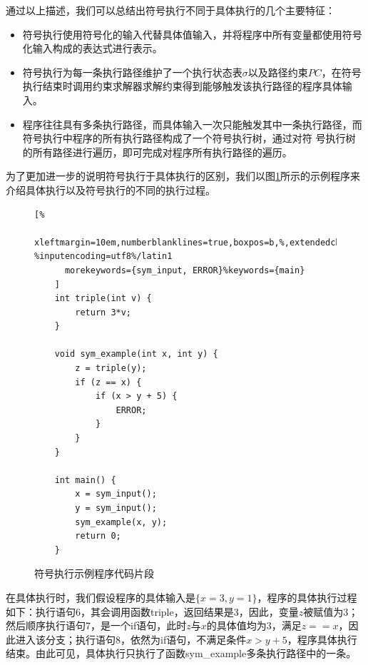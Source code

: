 通过以上描述，我们可以总结出符号执行不同于具体执行的几个主要特征：
\begin{itemize}
    \item 符号执行使用符号化的输入代替具体值输入，并将程序中所有变量都使用符号化输入构成的表达式进行表示。
    \item 符号执行为每一条执行路径维护了一个执行状态表$\sigma$以及路径约束$PC$，在符号执行结束时调用约束求解器求解约束得到能够触发该执行路径的程序具体输入。
    \item 程序往往具有多条执行路径，而具体输入一次只能触发其中一条执行路径，而符号执行中程序的所有执行路径构成了一个符号执行树，通过对符 号执行树的所有路径进行遍历，即可完成对程序所有执行路径的遍历。
\end{itemize}

为了更加进一步的说明符号执行于具体执行的区别，我们以图\ref{lst:symexeccode}所示的示例程序来介绍具体执行以及符号执行的不同的执行过程。
\begin{figure}[thbp]
    \begin{lstlisting}[%
      xleftmargin=10em,numberblanklines=true,boxpos=b,%,extendedchars=\true, %inputencoding=utf8%/latin1
      morekeywords={sym_input, ERROR}%keywords={main}
    ]
    int triple(int v) {
        return 3*v;
    }

    void sym_example(int x, int y) {
        z = triple(y);
        if (z == x) {
            if (x > y + 5) {
                ERROR;
            }
        }
    }

    int main() {
        x = sym_input();
        y = sym_input();
        sym_example(x, y);
        return 0;
    }
    \end{lstlisting}
    \caption{符号执行示例程序代码片段}
    \label{lst:symexeccode}
\end{figure}

在具体执行时，我们假设程序的具体输入是$\{x=3,y=1\}$，程序的具体执行过程如下：执行语句6，其会调用函数triple，返回结果是3，因此，变量$z$被赋值为3；然后顺序执行语句7，是一个if语句，此时$z$与$x$的具体值均为3，满足$z==x$，因此进入该分支；执行语句8，依然为if语句，不满足条件$x>y+5$，程序具体执行结束。由此可见，具体执行只执行了函数sym\_example多条执行路径中的一条。

